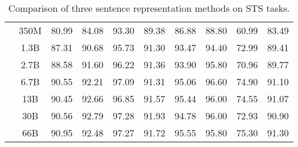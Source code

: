 \documentclass{article}
\begin{document}
\begin{table*}[h]
{\begin{tabular}{lccccccccc}
 &  350M & 80.99 & 84.08 & 93.30 & 89.38 & 86.88 & 88.80 & 60.99 & 83.49 \\
 &  1.3B & 87.31 & 90.68 & 95.73 & 91.30 & 93.47 & 94.40 & 72.99 & 89.41 \\
 &  2.7B & 88.58 & 91.60 & 96.22 & 91.36 & 93.90 & 95.80 & 70.96 & 89.77 \\
 &  6.7B & 90.55 & 92.21 & 97.09 & 91.31 & 95.06 & 96.60 & 74.90 & 91.10 \\
 &  13B  & 90.45 & 92.66 & 96.85 & 91.57 & 95.44 & 96.00 & 74.55 & 91.07 \\
 &  30B  & 90.56 & 92.79 & 97.28 & 91.93 & 94.78 & 96.00 & 72.93 & 90.90 \\
 &  66B  & 90.95 & 92.48 & 97.27 & 91.72 & 95.55 & 95.80 & 75.30 & 91.30 \\
\bottomrule
\end{tabular}}
\caption{ Comparison of three sentence representation methods on STS tasks.
}
\end{table*}
\end{document}
